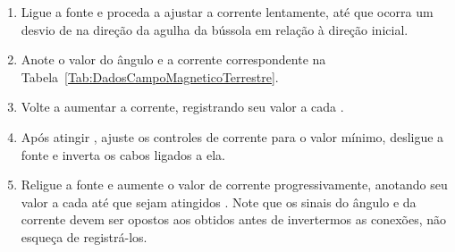 \begin{enumerate}
	\item Ligue a fonte e proceda a ajustar a corrente lentamente, até que ocorra um desvio de  na direção da agulha da bússola em relação à direção inicial.
	\item Anote o valor do ângulo e a corrente correspondente na Tabela~\ref{Tab:DadosCampoMagneticoTerrestre}.
	\item Volte a aumentar a corrente, registrando seu valor a cada .
	\item Após atingir , ajuste os controles de corrente para o valor mínimo, desligue a fonte e inverta os cabos ligados a ela.
	\item Religue a fonte e aumente o valor de corrente progressivamente, anotando seu valor a cada  até que sejam atingidos . Note que os sinais do ângulo e da corrente devem ser opostos aos obtidos antes de invertermos as conexões, não esqueça de registrá-los. 
\end{enumerate}

\cleardoublepage


\vspace{15mm}

\begin{fullwidth}
\noindent{}
\vspace{5mm}

\noindent{}

\noindent{}

\noindent{}

\noindent{}

\noindent{}
\end{fullwidth}

